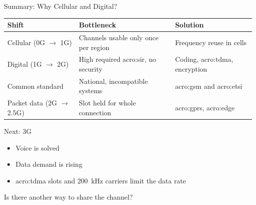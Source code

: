 \begin{frame}{Summary: Why Cellular and Digital?}
  \centering
  \begin{tabular}{lll}
    \toprule
    \textbf{Shift} & \textbf{Bottleneck} & \textbf{Solution} \\
    \midrule
    Cellular (0G $\rightarrow$ 1G) & Channels usable only once per region & Frequency reuse in cells \\
    Digital (1G $\rightarrow$ 2G) & High required \gls{acro:sir}, no security & Coding, \gls{acro:tdma}, encryption \\
    Common standard & National, incompatible systems & \Gls{acro:gsm} and \gls{acro:etsi} \\
    Packet data (2G $\rightarrow$ 2.5G) & Slot held for whole connection & \Gls{acro:gprs}, \gls{acro:edge} \\
    \bottomrule
  \end{tabular}

  \vspace{1em}
  \begin{block}{Next: 3G}
    \begin{itemize}
      \item Voice is solved
      \item Data demand is rising
      \item \Gls{acro:tdma} slots and \qty{200}{\kilo\hertz} carriers limit the data rate
    \end{itemize}
    Is there another way to share the channel?
  \end{block}
\end{frame}


